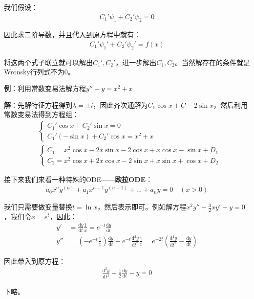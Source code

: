 \documentclass{ctexart}
\let\oldtextbf\textbf
\renewcommand{\textbf}[1]{\textcolor{brown!50!red}{\oldtextbf{#1}}}
\begin{document}
我们假设：
\begin{gather*}
  C_1'\psi_1+C_2'\psi_2=0
\end{gather*}

因此求二阶导数，并且代入到原方程中就有：
\begin{gather*}
  C_1'\psi_1'+C_2'\psi_2'=f(x)
\end{gather*}

将这两个式子联立就可以解出$C_1',C_2'$，进一步解出$C_1,C_2$。当然解存在的条件就是Wronsky行列式不为0。

\textbf{\color{brown!50!red}例}：利用常数变易法解方程$y''+y=x^2+x$

\textbf{\color{brown!50!red}解}：先解特征方程得到$\lambda=\pm i$，因此齐次通解为$C_1\cos x+C-2\sin x$，然后利用常数变易法得到方程组：
\begin{align*}
&\begin{cases}
C_1'\cos x+C_2'\sin x=0\\
C_1'(-\sin x)+C_2'\cos x=x^2+x
\end{cases}
\\
&\begin{cases}
C_1=x^2\cos x-2x\sin x-2\cos x+x\cos x-\sin x+D_1\\
C_2=x^2\cos x+2x\cos x-2\sin x+x\sin x+\cos x+D_2
\end{cases}
\end{align*}

接下来我们来看一种特殊的ODE——\textbf{\color{brown!50!red}欧拉ODE}：
\begin{align*}
    a_0x^ny^{(n)}+a_1x^{n-1}y^{(n-1)}+...+a_ny=0\quad(x>0)\tag{4-24}
\end{align*}

我们只需要做变量替换$t=\ln x$，然后表示即可。例如解方程$x^2y''+\frac{3}{2}xy'-y=0$，我们令$x=e^t$，因此：
\begin{align*}
y'&=\frac{\mathrm{d}y }{\mathrm{d}t }\frac{1}{x}=e^{-t}  \frac{\mathrm{d}y }{\mathrm{d}t }\\
y''&=(-e^{-t}\frac{1}{x} ) \frac{\mathrm{d}y }{\mathrm{d}t }+e^{-t}\frac{\mathrm{d}^2y }
{\mathrm{d}t^2}\frac{1}{x}=e^{-2t}(  \frac{\mathrm{d}^2y }
{\mathrm{d}t^2}-\frac{\mathrm{d}y }
{\mathrm{d}t})
\end{align*}

因此带入到原方程：
\begin{align*}
    \frac{\mathrm{d}^2y}{\mathrm{d}t^2}+\frac{1}{2}\frac{\mathrm{d}y}{\mathrm{d}t}-y=0
\end{align*}

下略。
\end{document}
